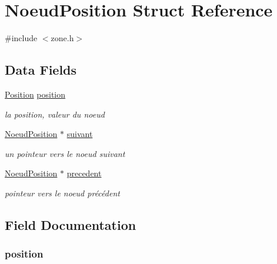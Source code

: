 \hypertarget{struct_noeud_position}{\section{Noeud\-Position Struct Reference}
\label{struct_noeud_position}
}


{\ttfamily \#include $<$zone.\-h$>$}

\subsection*{Data Fields}
\begin{DoxyCompactItemize}
\item 
\hyperlink{struct_position}{Position} \hyperlink{struct_noeud_position_a4d84949a19a29d3bb4dd2635c8241a83}{position}
\begin{DoxyCompactList}\small\item\em la position, valeur du noeud \end{DoxyCompactList}\item 
\hyperlink{struct_noeud_position}{Noeud\-Position} $\ast$ \hyperlink{struct_noeud_position_a0c42a292ccbdd10a535e9415f955281d}{suivant}
\begin{DoxyCompactList}\small\item\em un pointeur vers le noeud suivant \end{DoxyCompactList}\item 
\hyperlink{struct_noeud_position}{Noeud\-Position} $\ast$ \hyperlink{struct_noeud_position_a404485a763dfd5c73c7aa319e8c6f1bf}{precedent}
\begin{DoxyCompactList}\small\item\em pointeur vers le noeud précédent \end{DoxyCompactList}\end{DoxyCompactItemize}


\subsection{Field Documentation}
\hypertarget{struct_noeud_position_a4d84949a19a29d3bb4dd2635c8241a83}{
\subsubsection[{position}]{ position}}\label{struct_noeud_position_a4d84949a19a29d3bb4dd2635c8241a83}



